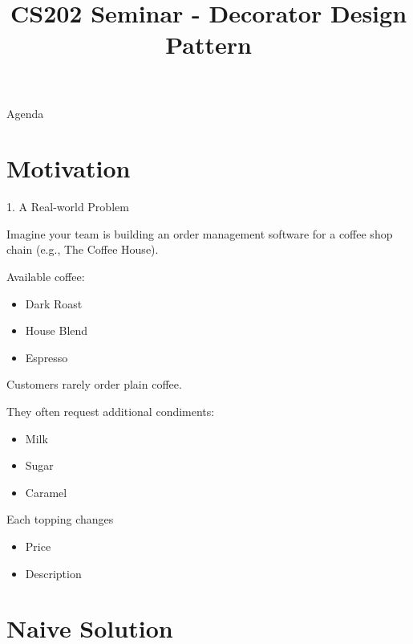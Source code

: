 \documentclass[aspectratio=169]{beamer}
\title{CS202 Seminar - Decorator Design Pattern}
\author{}
\date{}
\begin{document}

\begin{frame}
\titlepage
\end{frame}


\begin{frame}{Agenda}

\tableofcontents

\end{frame}

\section{Motivation}


\begin{frame}{1. A Real-world Problem}

Imagine your team is building an order management software for a coffee shop chain (e.g., The Coffee House).

Available coffee:

\begin{itemize}
\item Dark Roast
\item House Blend
\item Espresso
\end{itemize}

Customers rarely order plain coffee.

They often request additional condiments:

\begin{itemize}
\item Milk
\item Sugar
\item Caramel
\end{itemize}

Each topping changes

\begin{itemize}
\item Price
\item Description
\end{itemize}

\end{frame}


\section{Naive Solution}
\end{document}
